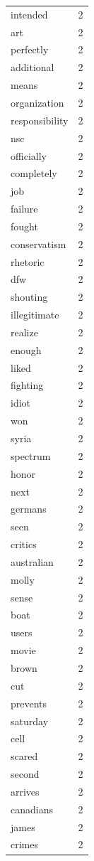 \begin{tabular}{lr}
intended & 2 \\
art & 2 \\
perfectly & 2 \\
additional & 2 \\
means & 2 \\
organization & 2 \\
responsibility & 2 \\
nsc & 2 \\
officially & 2 \\
completely & 2 \\
job & 2 \\
failure & 2 \\
fought & 2 \\
conservatism & 2 \\
rhetoric & 2 \\
dfw & 2 \\
shouting & 2 \\
illegitimate & 2 \\
realize & 2 \\
enough & 2 \\
liked & 2 \\
fighting & 2 \\
idiot & 2 \\
won & 2 \\
syria & 2 \\
spectrum & 2 \\
honor & 2 \\
next & 2 \\
germans & 2 \\
seen & 2 \\
critics & 2 \\
australian & 2 \\
molly & 2 \\
sense & 2 \\
boat & 2 \\
users & 2 \\
movie & 2 \\
brown & 2 \\
cut & 2 \\
prevents & 2 \\
saturday & 2 \\
cell & 2 \\
scared & 2 \\
second & 2 \\
arrives & 2 \\
canadians & 2 \\
james & 2 \\
crimes & 2 \\

\end{tabular}
